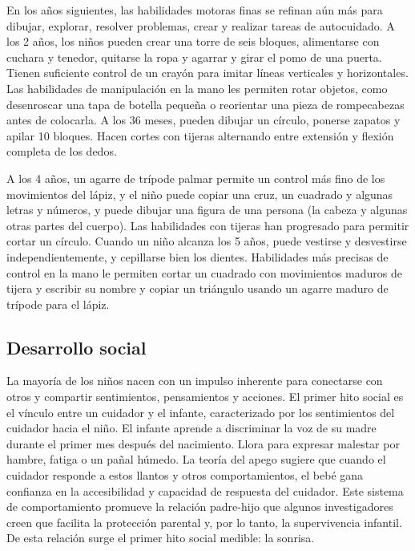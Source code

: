\documentclass[11pt,letterpaper]{report}
\begin{document}
En los años siguientes, las habilidades motoras finas se refinan aún más para
dibujar, explorar, resolver problemas, crear y realizar tareas de autocuidado.
A los 2 años, los niños pueden crear una torre de seis bloques, alimentarse con
cuchara y tenedor, quitarse la ropa y agarrar y girar el pomo de una puerta.
Tienen suficiente control de un crayón para imitar líneas verticales y
horizontales. Las habilidades de manipulación en la mano les permiten rotar
objetos, como desenroscar una tapa de botella pequeña o reorientar una pieza de
rompecabezas antes de colocarla. A los 36 meses, pueden dibujar un círculo,
ponerse zapatos y apilar 10 bloques. Hacen cortes con tijeras alternando entre
extensión y flexión completa de los dedos. \cite{Gerber2010}

A los 4 años, un agarre de trípode palmar permite un control más fino de los
movimientos del lápiz, y el niño puede copiar una cruz, un cuadrado y algunas
letras y números, y puede dibujar una figura de una persona (la cabeza y
algunas otras partes del cuerpo). Las habilidades con tijeras han progresado
para permitir cortar un círculo. Cuando un niño alcanza los 5 años, puede
vestirse y desvestirse independientemente, y cepillarse bien los dientes.
Habilidades más precisas de control en la mano le permiten cortar un cuadrado
con movimientos maduros de tijera y escribir su nombre y copiar un triángulo
usando un agarre maduro de trípode para el lápiz.
\cite{Gerber2010}

\subsection{Desarrollo social}
La mayoría de los niños nacen con un impulso inherente para conectarse con
otros y compartir sentimientos, pensamientos y acciones. El primer hito social
es el vínculo entre un cuidador y el infante, caracterizado por los
sentimientos del cuidador hacia el niño. El infante aprende a discriminar la
voz de su madre durante el primer mes después del nacimiento. Llora para
expresar malestar por hambre, fatiga o un pañal húmedo. La teoría del apego
sugiere que cuando el cuidador responde a estos llantos y otros
comportamientos, el bebé gana confianza en la accesibilidad y capacidad de
respuesta del cuidador. Este sistema de comportamiento promueve la relación
padre-hijo que algunos investigadores creen que facilita la protección parental
y, por lo tanto, la supervivencia infantil. De esta relación surge el primer
hito social medible: la sonrisa. \cite{Gerber2011}
\end{document}

